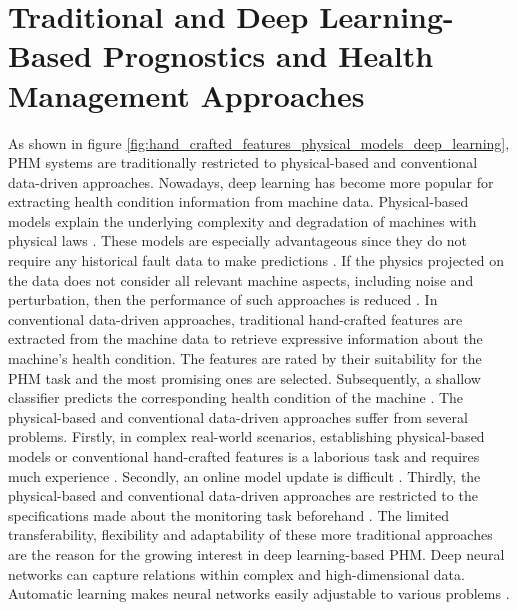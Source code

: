 \section{Traditional and Deep Learning-Based Prognostics and Health Management Approaches}
As shown in figure \ref{fig:hand_crafted_features_physical_models_deep_learning}, PHM systems are traditionally restricted to physical-based and conventional data-driven approaches. Nowadays, deep learning has become more popular for extracting health condition information from machine data. Physical-based models explain the underlying complexity and degradation of machines with physical laws \cite{ZHAO2019213}. These models are especially advantageous since they do not require any historical fault data to make predictions \cite{Benker2019}. If the physics projected on the data does not consider all relevant machine aspects, including noise and perturbation, then the performance of such approaches is reduced \cite{ZHAO2019213}. In conventional data-driven approaches, traditional hand-crafted features are extracted from the machine data to retrieve expressive information about the machine's health condition. The features are rated by their suitability for the PHM task and the most promising ones are selected. Subsequently, a shallow classifier predicts the corresponding health condition of the machine \cite{ZHAO2019213}. The physical-based and conventional data-driven approaches suffer from several problems. Firstly, in complex real-world scenarios, establishing physical-based models or conventional hand-crafted features is a laborious task and requires much experience \cite{ZHAO2019213}. Secondly, an online model update is difficult \cite{ZHAO2019213}. Thirdly, the physical-based and conventional data-driven approaches are restricted to the specifications made about the monitoring task beforehand \cite{ZHAO2019213}. The limited transferability, flexibility and adaptability of these more traditional approaches are the reason for the growing interest in deep learning-based PHM. Deep neural networks can capture relations within complex and high-dimensional data. Automatic learning makes neural networks easily adjustable to various problems \cite{ZHAO2019213}.
